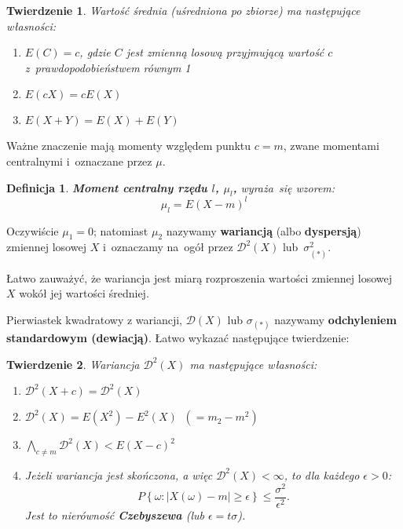 \documentclass[10pt,a4paper]{article}
\newtheorem{definition}{Definicja}[section]
\newtheorem{theorem}{Twierdzenie}[section]
\begin{document}
\begin{theorem}
  Wartość średnia (uśredniona po zbiorze) ma następujące własności:
  \begin{enumerate}
    \item[a)] $E(C) = c$, gdzie $C$ jest zmienną losową przyjmującą wartość $c$
      z~prawdopodobieństwem równym 1
    \item[b)] $E(cX) = cE(X)$
    \item[c)] $E(X+Y) = E(X) + E(Y)$
  \end{enumerate}
\end{theorem}

Ważne znaczenie mają momenty względem punktu  $c=m$, zwane momentami centralnymi
i~oznaczane przez $\mu$.

\begin{definition}
  \textbf{Moment centralny rzędu $l$, $\mu_l$,} wyraża~się wzorem:
  \begin{equation}
    \mu_l = E(X-m)^l
  \end{equation}
\end{definition}

Oczywiście $\mu_1 = 0$; natomiast $\mu_2$ nazywamy \textbf{wariancją} (albo
\textbf{dyspersją}) zmiennej losowej $X$ i~oznaczamy na~ogół przez
$\mathscr{D}^2(X)$ lub~$\sigma_{(*)}^2$.

Łatwo zauważyć, że wariancja jest miarą rozproszenia wartości zmiennej
losowej $X$ wokół jej  wartości średniej.

Pierwiastek kwadratowy z wariancji, $\mathscr{D}(X)$ lub $\sigma_{(*)}$ nazywamy
\textbf{odchyleniem standardowym (dewiacją)}. Łatwo wykazać następujące
twierdzenie:

\begin{theorem}
  Wariancja $\mathscr{D}^2(X)$ ma następujące własności:
  \begin{enumerate}
    \item[a)] $\mathscr{D}^2(X+c) = \mathscr{D}^2{(X)}$
    \item[b)] $\mathscr{D}^2(X) = E(X^2) - E^2(X)\;\;(=m_2-m^2)$
    \item[c)] $\bigwedge_{c\neq m}\mathscr{D}^2(X)<E(X-c)^2$
    \item[d)] Jeżeli wariancja jest skończona, a więc $\mathscr{D}^2(X)<\infty$,
      to dla każdego $\epsilon > 0$:
      \[
        P\left\{\omega:|X(\omega)-m|\geq \epsilon\right\}\leq
        \frac{\sigma^2}{\epsilon^2}.
      \]
      Jest to nierówność \textbf{Czebyszewa} (lub $\epsilon = t\sigma$).
  \end{enumerate}
\end{theorem}
\end{document}
